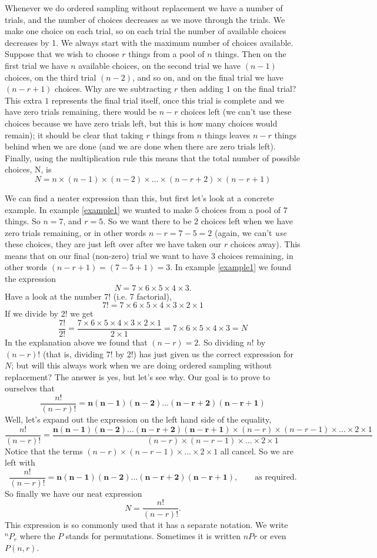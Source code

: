 \noindent Whenever we do ordered sampling without replacement we have a number of trials, and the number of choices decreases as we move through the trials. We make one choice on each trial, so on each trial the number of available choices decreases by 1. We always start with the maximum number of choices available. Suppose that we wish to choose $r$ things from a pool of $n$ things. Then on the first trial we have $n$ available choices, on the second trial we have $(n-1)$ choices, on the third trial $(n-2)$, and so on, and on the final trial we have $(n-r+1)$ choices. Why are we subtracting $r$ then adding $1$ on the final trial? This extra $1$ represents the final trial itself, once this trial is complete and we have zero trials remaining, there would be $n-r$ choices left (we can't use these choices because we have zero trials left, but this is how many choices would remain); it should be clear that taking $r$ things from $n$ things leaves $n-r$ things behind when we are done (and we are done when there are zero trials left). Finally, using the multiplication rule this means that the total number of possible choices, N, is
\[
N = n \times (n-1) \times (n-2) \times \ldots \times (n - r + 2) \times (n - r + 1)
\]

\noindent We can find a neater expression than this, but first let's look at a concrete example. In example \ref{example1} we wanted to make $5$ choices from a pool of $7$ things. So $n = 7$, and $r = 5$. So we want there to be $2$ choices left when we have zero trials remaining, or in other words  $n - r = 7 - 5 = 2$ (again, we can't \textit{use} these choices, they are just left over after we have taken our $r$ choices away). This means that on our final (non-zero) trial we want to have 3 choices remaining, in other words $(n - r + 1) = (7-5+1) = 3$. In example \ref{example1} we found the expression
\[
N = 7\times 6 \times 5 \times 4 \times 3.
\]
Have a look at the number 7! (i.e. 7 factorial),
\[
7! = 7\times 6 \times 5 \times 4 \times 3\times 2 \times 1
\]
If we divide by 2! we get
\[
\frac{7!}{2!} = \frac{7\times 6 \times 5 \times 4 \times 3\times 2 \times 1}{2\times 1} = 7\times 6 \times 5 \times 4 \times 3 = N
\]
In the explanation above we found that $(n-r) = 2$. So dividing $n!$ by $(n - r)!$ (that is, dividing 7! by 2!) has just given us the correct expression for $N$; but will this always work when we are doing ordered sampling without replacement? The answer is yes, but let's see why. Our goal is to prove to ourselves that
\[
\frac{n!}{(n-r)!} = \boldsymbol{n(n-1)(n-2)\ldots(n-r+2)(n-r+1)}
\]
Well, let's expand out the expression on the left hand side of the equality,
\[
\frac{n!}{(n-r)!} = \frac{\boldsymbol{n(n-1)(n-2)\ldots(n-r+2)(n-r+1)}\times(n-r)\times(n-r-1)\times\ldots\times2\times1}{(n-r)\times(n-r-1)\times\ldots\times2\times1}
\]
Notice that the terms $(n-r)\times(n-r-1)\times\ldots\times2\times1$ all cancel. So we are left with 
\[
\frac{n!}{(n-r)!} =  \boldsymbol{n(n-1)(n-2)\ldots(n-r+2)(n-r+1)}, \qquad \text{as required.}
\]
So finally we have our neat expression
\[
N = \frac{n!}{(n-r)!}. \label{nPr}
\]
This expression is so commonly used that it has a separate notation. We write $^nP_r$ where the $P$ stands for permutations. Sometimes it is written $nPr$ or even $P(n,r)$.

